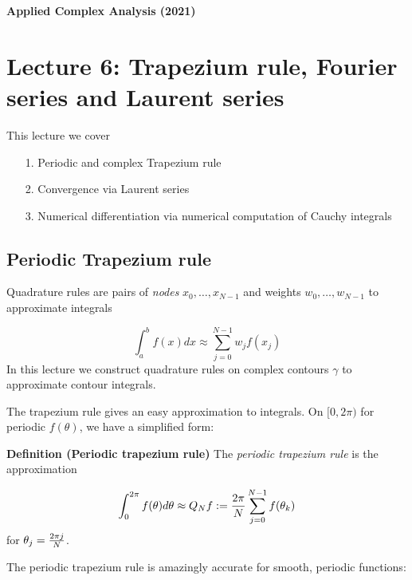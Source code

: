 \documentclass[12pt,a4paper]{article}
\begin{document}
\textbf{Applied Complex Analysis (2021)}

\section{Lecture 6: Trapezium rule, Fourier series and Laurent series}
This lecture we cover

\begin{itemize}
\item[1. ] Periodic and complex Trapezium rule


\item[2. ] Convergence via Laurent series


\item[3. ] Numerical differentiation via numerical computation of Cauchy integrals

\end{itemize}
\subsection{Periodic Trapezium rule}
Quadrature rules are pairs of \emph{nodes} $x_0,\ldots,x_{N-1}$ and weights $w_0,\ldots,w_{N-1}$ to approximate integrals

\[
\int_a^b f(x) dx \approx \sum_{j=0}^{N-1} w_j f(x_j)
\]
In this lecture we construct quadrature rules on complex contours $\gamma$ to approximate contour integrals.

The trapezium rule gives an easy approximation to integrals. On $[0,2\pi)$ for periodic $f(\theta)$, we have a simplified form:

\textbf{Definition (Periodic trapezium rule)} The \emph{periodic trapezium rule} is the approximation

\[
\int_0^{2 \pi} f(\theta) d \theta \approx Q_N f := {2\pi \over N} \sum_{j=0}^{N-1} f(\theta_k)
\]
for $\theta_j = {2 \pi j \over N}$.

The periodic trapezium rule is amazingly accurate for smooth, periodic functions:
\end{document}
